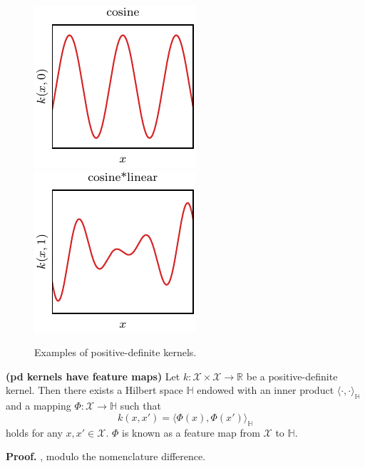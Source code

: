 \begin{figure}[t]
	\includegraphics{../images/chap2_kernel_cs.pdf} \hspace{3pt}
	\includegraphics{../images/chap2_kernel_csli.pdf} 
	\caption{Examples of positive-definite kernels.}
	\label{fig.pd_kernels}
\end{figure}

\begin{proposition}
	\label{thm.pd_kernels_feature_maps}
	\textbf{(\ac{pd} kernels have feature maps)} 
	Let $k:\mathcal{X} \times \mathcal{X} \rightarrow \mathbb{R} $ be a positive-definite kernel. Then there exists a Hilbert space $\mathbb{H}$ endowed with an inner product $\langle \cdot,\cdot \rangle_\mathbb{H}$ and a mapping $\Phi :  \mathcal{X} \rightarrow \mathbb{H}$ such that 
	\begin{equation}
		\label{eq.kernels_feat_maps}
		k(x,x') = \langle \Phi(x),\Phi(x') \rangle_\mathbb{H}
	\end{equation}
	holds for any $x,x' \in \mathcal{X}$. $\Phi$ is known as a feature map from $\mathcal{X}$ to $\mathbb{H}$.
\end{proposition}

\vspace{-14pt}
\begin{my_proof}
	\textbf{Proof.}
	\cite[Theorem~4.16]{steinwart2008svm_book}, modulo the nomenclature difference.
\end{my_proof}

